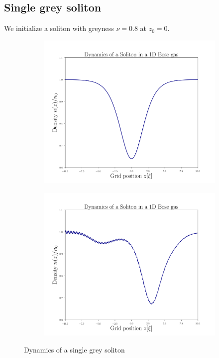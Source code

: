 \subsection{Single grey soliton}
We initialize a soliton with greyness $\nu = 0.8$ at $z_0 = 0$.
 \begin{figure}[H]
 \centering
 \begin{subfigure}{0.42\textwidth} 
 	\includegraphics[width= \textwidth]{figures/single_grey_0}
 \end{subfigure}
 \begin{subfigure}{0.42\textwidth} 
 	\includegraphics[width= \textwidth]{figures/single_grey_400}
 \end{subfigure}
 \caption{Dynamics of a single grey soliton}	
 \end{figure}
 
